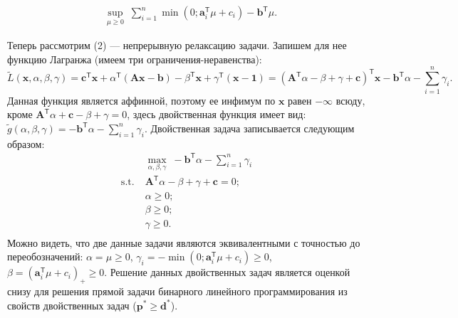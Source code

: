 \documentclass[a4paper,12pt]{article}
\renewcommand{\geq}{\geqslant}
\renewcommand{\top}{\mathsf{T}}
\begin{document}
\begin{enumerate}
	\begin{equation*}
	\begin{aligned}
		& \sup\limits_{\mu\geq0}\;  \sum\limits_{i=1}^{n} \min(0;\mathbf{a}_i^\top \mu + c_i) -\mathbf{b}^\top\mu.
	\end{aligned}
	\end{equation*}
	
	Теперь рассмотрим (2) --- непрерывную релаксацию задачи. Запишем для нее функцию Лагранжа (имеем три ограничения-неравенства):
	\begin{equation*}
		\tilde{L}(\mathbf{x}, \alpha,\beta,\gamma) = \mathbf{c}^\top\mathbf{x} + \alpha^\top(\mathbf{A}\mathbf{x}-\mathbf{b}) - \beta^\top \mathbf{x} + \gamma^\top (\mathbf{x}-\mathbf{1}) = (\mathbf{A}^\top \alpha  - \beta + \gamma+ \mathbf{c})^\top \mathbf{x} - \mathbf{b}^\top \alpha - \sum\limits_{i=1}^n \gamma_i.
	\end{equation*}
	Данная функция является аффинной, поэтому ее инфимум по $\mathbf{x}$ равен $-\infty$ всюду, кроме $\mathbf{A}^\top \alpha + \mathbf{c} - \beta + \gamma = 0$, здесь двойственная функция имеет вид: $\tilde{g}(\alpha,\beta,\gamma) = -\mathbf{b}^\top \alpha - \sum\limits_{i=1}^n \gamma_i$. Двойственная задача записывается следующим образом:
	\begin{equation*}
	\begin{aligned}
		& \max\limits_{\alpha,\beta,\gamma}\; -\mathbf{b}^\top \alpha - \sum\limits_{i=1}^n \gamma_i \\
		\text{s.t.}\; & \mathbf{A}^\top \alpha  - \beta + \gamma + \mathbf{c} = 0;\\
		& \alpha \geq 0; \\
		& \beta \geq 0; \\
		& \gamma \geq 0. \\
	\end{aligned}
\end{equation*}
Можно видеть, что две данные задачи являются эквивалентными с точностью до переобозначений: $\alpha = \mu \geq 0$, $\gamma_i = -\min(0;\mathbf{a}_i^\top \mu + c_i) \geq 0$, $\beta=(\mathbf{a}_i^\top \mu + c_i)_+ \geq 0$. Решение данных двойственных задач является оценкой снизу для решения прямой задачи бинарного линейного программирования из свойств двойственных задач ($\mathbf{p}^* \geq \mathbf{d}^*$).


\end{enumerate}
\end{document}
